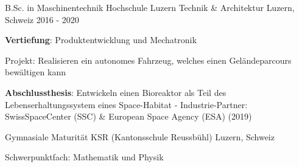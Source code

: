 

\begin{cventries}

\cventry
{B.Sc. in Maschinentechnik} %
{Hochschule Luzern Technik \& Architektur} %
{Luzern, Schweiz} %
{2016 - 2020} %
{
	\begin{cvitems} %
		\item {\textbf{Vertiefung}: Produktentwicklung und Mechatronik}
		\item {Projekt: Realisieren ein autonomes Fahrzeug, welches einen Geländeparcours bewältigen kann}
		\item {\textbf{Abschlussthesis}: Entwickeln einen Bioreaktor als Teil des Lebenserhaltungssystem eines Space-Habitat - \newline Industrie-Partner: \mbox{SwissSpaceCenter} (SSC) \& European Space Agency (ESA) (2019)}
	\end{cvitems}
}



  \cventry
    {Gymnasiale Maturität} %
    {KSR (Kantonsschule Reussbühl)} %
    {Luzern, Schweiz} %
    {} %
    {
      \begin{cvitems} %
        \item {Schwerpunktfach: Mathematik und Physik}
      \end{cvitems}
    }

\end{cventries}
